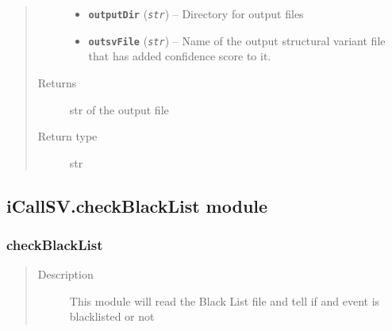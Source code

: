 \documentclass[letterpaper,10pt,english]{sphinxmanual}
\begin{document}
\begin{fulllineitems}
\begin{quote}
\begin{description}
\begin{itemize}
\item {} 
\textbf{\texttt{outputDir}} (\emph{\texttt{str}}) -- Directory for output files

\item {} 
\textbf{\texttt{outsvFile}} (\emph{\texttt{str}}) -- Name of the output structural variant file that has added confidence score to it.

\end{itemize}

\item[{Returns}] \leavevmode
str of the output file

\item[{Return type}] \leavevmode
str

\end{description}\end{quote}

\end{fulllineitems}



\subsection{iCallSV.checkBlackList module}
\label{iCallSV:icallsv-checkblacklist-module}\label{iCallSV:module-iCallSV.checkBlackList}

\subsubsection{checkBlackList}
\label{iCallSV:checkblacklist}\begin{quote}\begin{description}
\item[{Description}] \leavevmode
This module will read the Black List file and tell if and event is blacklisted or not

\end{description}\end{quote}
\end{document}
